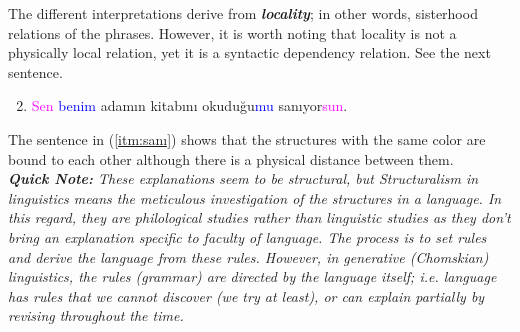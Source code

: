\documentclass[12pt,a4paper]{article}
\begin{document}

The different interpretations derive from \emph{\textbf{locality}}; in other words, sisterhood relations of the phrases. However, it is worth noting that locality is not a physically local relation, yet it is a syntactic dependency relation. See the next sentence.
\begin{enumerate}
\setcounter{enumi}{1}
\item \textcolor{magenta}{Sen} \textcolor{blue}{benim} adamın kitabını okuduğu\textcolor{blue}{mu} sanıyor\textcolor{magenta}{sun}.\label{itm:sanı}
\end{enumerate}

The sentence in (\ref{itm:sanı}) shows that the structures with the same color are bound to each other although there is a physical distance between them.\\

\indent \textit{\textbf{Quick Note:} These explanations seem to be structural, but Structuralism in linguistics means the meticulous investigation of the structures in a language. In this regard, they are philological studies rather than linguistic studies as they don't bring an explanation specific to faculty of language. The process is to set rules and derive the language from these rules. However, in generative (Chomskian) linguistics, the rules (grammar) are directed by the language itself; i.e. language has rules that we cannot discover (we try at least), or can explain partially by revising throughout the time.}\\
\end{document}
